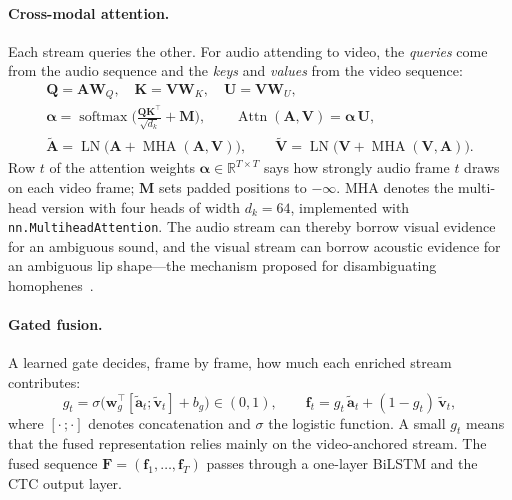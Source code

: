 \paragraph{Cross-modal attention.} Each stream queries the other. For audio
attending to video, the \emph{queries} come from the audio sequence and the
\emph{keys} and \emph{values} from the video sequence:
\begin{gather}
\mathbf{Q} = \mathbf{A}\mathbf{W}_Q,\quad \mathbf{K} = \mathbf{V}\mathbf{W}_K,\quad \mathbf{U} = \mathbf{V}\mathbf{W}_U, \\
\boldsymbol{\alpha} = \operatorname{softmax}\!\Big(\frac{\mathbf{Q}\mathbf{K}^{\top}}{\sqrt{d_k}} + \mathbf{M}\Big),
\qquad
\operatorname{Attn}(\mathbf{A},\mathbf{V}) = \boldsymbol{\alpha}\,\mathbf{U}, \\
\tilde{\mathbf{A}} = \operatorname{LN}\big(\mathbf{A} + \operatorname{MHA}(\mathbf{A},\mathbf{V})\big),
\qquad
\tilde{\mathbf{V}} = \operatorname{LN}\big(\mathbf{V} + \operatorname{MHA}(\mathbf{V},\mathbf{A})\big).
\end{gather}
Row $t$ of the attention weights $\boldsymbol{\alpha}\in\mathbb{R}^{T\times T}$
says how strongly audio frame $t$ draws on each video frame; $\mathbf{M}$ sets
padded positions to $-\infty$. MHA denotes the multi-head version with four heads
of width $d_k=64$, implemented with \texttt{nn.MultiheadAttention}. The audio
stream can thereby borrow visual evidence for an ambiguous sound, and the
visual stream can borrow acoustic evidence for an ambiguous lip shape---the
mechanism proposed for disambiguating homophenes~\cite{li2023}.

\paragraph{Gated fusion.} A learned gate decides, frame by frame, how much each
enriched stream contributes:
\begin{equation}
g_t = \sigma\big(\mathbf{w}_g^{\top}[\tilde{\mathbf{a}}_t ; \tilde{\mathbf{v}}_t] + b_g\big) \in (0,1),
\qquad
\mathbf{f}_t = g_t\,\tilde{\mathbf{a}}_t + (1-g_t)\,\tilde{\mathbf{v}}_t ,
\label{eq:gate}
\end{equation}
where $[\cdot\,;\cdot]$ denotes concatenation and $\sigma$ the logistic function.
A small $g_t$ means that the fused representation relies mainly on the
video-anchored stream. The fused sequence $\mathbf{F}=(\mathbf{f}_1,\dots,\mathbf{f}_T)$
passes through a one-layer BiLSTM and the CTC output layer.

